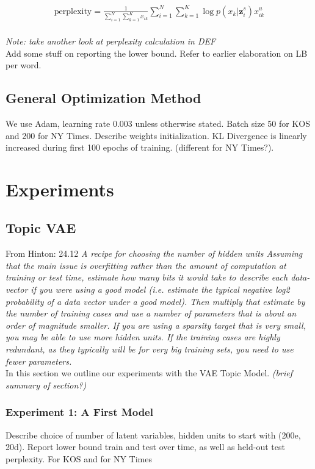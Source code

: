 \documentclass{report}
\begin{document}
	
	\begin{align}
	\text{perplexity} =  \frac{1}{\sum\limits_{i=1}^{N}\sum\limits_{k=1}^{K}x_{ik}}\sum\limits_{i=1}^N\sum\limits_{k=1}^{K} \log p(x_{k}|\mathbf{z}_{i}^{s})x_{ik}^{u}
	\end{align}\\
	\textit{Note: take another look at perplexity calculation in DEF}
	\\
	Add some stuff on reporting the lower bound. Refer to earlier elaboration on LB per word.
	
	\subsection{General Optimization Method}\label{optim_section}
	We use Adam, learning rate 0.003 unless otherwise stated. Batch size 50 for KOS and 200 for NY Times. Describe weights initialization. KL Divergence is linearly increased during first 100 epochs of training. (different for NY Times?).
	

	\section{Experiments}
	\subsection{Topic VAE}
	
	From Hinton: 24.12 \textit{A recipe for choosing the number of hidden units
		Assuming that the main issue is overfitting rather than the amount of computation at training or
		test time, estimate how many bits it would take to describe each data-vector if you were using a good
		model (i.e. estimate the typical negative log2 probability of a data vector under a good model). Then
		multiply that estimate by the number of training cases and use a number of parameters that is about
		an order of magnitude smaller. If you are using a sparsity target that is very small, you may be able
		to use more hidden units. If the training cases are highly redundant, as they typically will be for very
		big training sets, you need to use fewer parameters.}\\

	In this section we outline our experiments with the VAE Topic Model. \textit{(brief summary of section?)} 
	
	
	
	\subsubsection{Experiment 1: A First Model}
	Describe choice of number of latent variables, hidden units to start with (200e, 20d). Report lower bound train and test over time, as well as held-out test perplexity. For KOS and for NY Times
	
\end{document}
